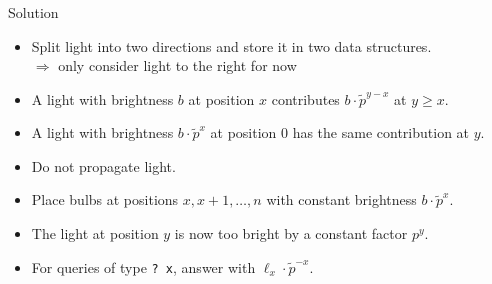 \begin{frame}
	\frametitle{\problemtitle}
	\begin{block}{Solution}
		\begin{itemize}
			\setlength{\itemsep}{0pt}
			\item<2-> Split light into two directions and store it in two data structures.\\
			$\Longrightarrow$ only consider light to the right for now
			
			\item<3-> A light with brightness $b$ at position $x$ contributes $b\cdot \tilde{p}^{y-x}$ at $y\geq x$.
			
			\item<4-> A light with brightness $b\cdot\tilde{p}^{x}$ at position $0$ has the same contribution at $y$.
			
			\item<5-> Do not propagate light.
			\item<5-> Place bulbs at positions $x,x+1,\dots,n$ with constant brightness $b\cdot\tilde{p}^{x}$.
			
			\item<6-> The light at position $y$ is now too bright by a constant factor $p^y$.
			\item<6-> For queries of type \texttt{?~x}, answer with $\ell_x\cdot \tilde{p}^{-x}$.
			

\end{itemize}
\end{block}
\end{frame}
